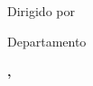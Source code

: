 \begin{titlepage}
\begin{minipage}{0.78\textwidth}
    \vspace{0.65cm}

    {\normalsize Dirigido por\par}
    \vspace{0.15cm}
    {\large\bfseries\TFGTutor\par}

    \vspace{0.65cm}

    {\normalsize Departamento\par}
    \vspace{0.15cm}
    {\large\bfseries\TFGDepartment\par}
  \end{minipage}

  \vfill

  \begin{flushright}
    \large\bfseries
    \TFGLocation, \TFGDate
  \end{flushright}
\end{titlepage}
